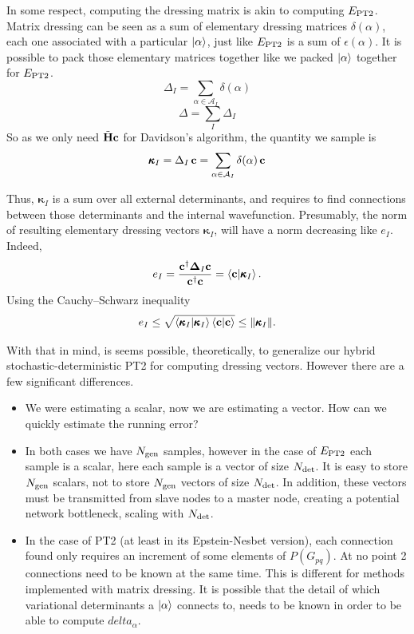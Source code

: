 \documentclass[./thesis.tex]{subfiles}
\begin{document}
In some respect, computing the dressing matrix is akin to computing $E_\text{PT2}$. Matrix dressing can be seen as a sum of elementary dressing matrices $\delta(\alpha)$, each one associated with a particular $\ket \alpha$, just like $E_\text{PT2}$ is a sum of $\epsilon(\alpha)$. It is possible to pack those elementary matrices together like we packed $\ket \alpha$ together for $E_\text{PT2}$.
\begin{equation}
\Delta_I = \sum_{\alpha \in \mathcal{A}_I} \delta(\alpha)
\end{equation}
\begin{equation}
\Delta = \sum_{I} \Delta_I
\end{equation}
So as we only need $\tilde{\bf H}{\bf c}$ for Davidson's algorithm, the quantity we sample is 
\begin{equation}
{\pmb \kappa}_I = \Delta_I\, {\bf c} = \sum_{\alpha \in \mathcal{A}_I} \delta(\alpha)\, {\bf c}
\end{equation}

Thus, ${\pmb \kappa}_I$ is a sum over all external determinants, and requires to find connections between those determinants and the internal wavefunction. Presumably, the norm of resulting elementary dressing vectors $\pmb \kappa_I$, will have a norm decreasing like $e_I$. Indeed, 
\begin{equation}
e_I = \frac{{\bf c}^\dagger {\bf \Delta}_I {\bf c}}{{\bf c}^\dagger {\bf c}} = \braket{\bf c}{\pmb \kappa_I}.
\end{equation}
Using the Cauchy–Schwarz inequality
\begin{equation}
e_I \le \sqrt{ \braket{{\pmb \kappa}_I}{{\pmb \kappa}_I} \braket{\bf c}{\bf c} } \le
\norm{{\pmb \kappa}_I}.
\end{equation}

With that in mind, is seems possible, theoretically, to generalize our hybrid stochastic-deterministic PT2 for computing dressing vectors.
However there are a few significant differences.
\begin{itemize}
\item
We were estimating a scalar, now we are estimating a vector. How can we quickly estimate the running error?
\item
In both cases we have ${N_\text{gen}}$ samples, however in the case of $E_\text{PT2}$ each sample is a scalar, here each sample is a vector of size ${N_\text{det}}$. It is easy to store ${N_\text{gen}}$ scalars, not to store ${N_\text{gen}}$ vectors of size ${N_\text{det}}$. In addition, these vectors must be transmitted from slave nodes to a master node, creating a potential network bottleneck, scaling with ${N_\text{det}}$.
\item
In the case of PT2 (at least in its Epstein-Nesbet version), each connection found only requires an increment of some elements of $P(G_{pq})$. At no point 2 connections need to be known at the same time. This is different for methods implemented with matrix dressing. It is possible that the detail of which variational determinants a $\ket \alpha$ connects to, needs to be known in order to be able to compute $delta_\alpha$.
\end{itemize}
\end{document}
